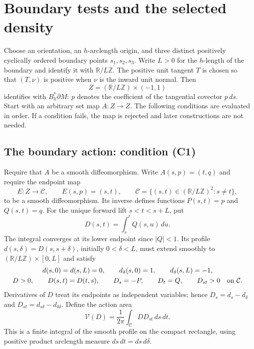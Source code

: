 \documentclass[11pt]{article}
\theoremstyle{remark}
\newcommand{\Cpair}{\mathcal C}
\newcommand{\Varea}{\mathcal V}
\newcommand{\dd}{\,d}
\begin{document}
\section{Boundary tests and the selected density}\label{sec:conditions}
Choose an orientation, an $h$-arclength origin, and three distinct
positively cyclically ordered boundary points $s_1,s_2,s_3$.
Write $L>0$ for the $h$-length of the boundary and identify it with
$\mathbb R/L\mathbb Z$. The positive unit tangent $T$ is chosen so that
$(T,\nu)$ is positive when $\nu$ is the inward unit normal.
Then
\[
 Z=(\mathbb R/L\mathbb Z)\times(-1,1)
\]
identifies with $B_h^*\partial M$: $p$ denotes the coefficient of the
tangential covector $p\,ds$. Start with an arbitrary set map $A:Z\to Z$.
The following conditions are evaluated in order. If a condition fails,
the map is rejected and later constructions are not needed.

\subsection{The boundary action: condition (C1)}\label{subsec:c1}
Require that $A$ be a smooth diffeomorphism. Write $A(s,p)=(t,q)$ and
require the endpoint map
\[
 E:Z\longrightarrow\Cpair,
 \qquad E(s,p)=(s,t),\qquad
 \Cpair=\{(s,t)\in(\mathbb R/L\mathbb Z)^2:s\ne t\},
\]
to be a smooth diffeomorphism. Its inverse defines functions
$P(s,t)=p$ and $Q(s,t)=q$. For the unique forward lift $s<t<s+L$, put
\begin{equation}\label{eq:primitive}
 D(s,t)=\int_s^t Q(s,u)\dd u.
\end{equation}
The integral converges at its lower endpoint since $|Q|<1$.
Its profile $d(s,\delta)=D(s,s+\delta)$, initially $0<\delta<L$,
must extend smoothly to $(\mathbb R/L\mathbb Z)\times[0,L]$ and satisfy
\begin{gather}\label{eq:profile}
 d(s,0)=d(s,L)=0,\qquad
 d_\delta(s,0)=1,\qquad d_\delta(s,L)=-1,\\
 D>0,\qquad D(s,t)=D(t,s),\qquad
 D_s=-P,\qquad D_t=Q,\qquad D_{st}>0\quad\hbox{on }\Cpair.
 \label{eq:action}
\end{gather}
Derivatives of $D$ treat its endpoints as independent variables; hence
$D_s=d_s-d_\delta$ and $D_{st}=d_{s\delta}-d_{\delta\delta}$.
Define the action area
\begin{equation}\label{eq:area-action}
 \Varea(D)=\frac1{2\pi}\int_{\Cpair}D D_{st}\dd s\dd t.
\end{equation}
This is a finite integral of the smooth profile on the compact rectangle,
using positive product arclength measure $ds\,dt=ds\,d\delta$.
\end{document}
